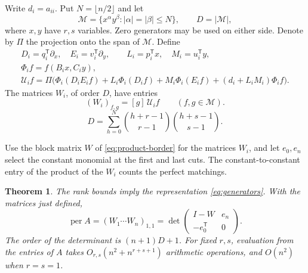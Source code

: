 \documentclass[11pt,reqno]{amsart}
\newtheorem{theorem}{Theorem}[section]
\theoremstyle{remark}
\numberwithin{equation}{section}
\newcommand{\per}{\operatorname{per}}
\begin{document}
Write \(d_i=a_{ii}\). Put \(N=\lfloor n/2\rfloor\) and let
\[
 \mathcal M=\{x^\alpha y^\beta:|\alpha|=|\beta|\leq N\},
 \qquad D=|\mathcal M|,
\]
where \(x,y\) have \(r,s\) variables. Zero generators may be used on either side. Denote by \(\Pi\) the
projection onto the span of \(\mathcal M\). Define
\[
 \begin{gathered}
 D_i=q_i^{\mathsf T}\partial_x,\quad E_i=v_i^{\mathsf T}\partial_y,
 \qquad L_i=p_i^{\mathsf T}x,\quad M_i=u_i^{\mathsf T}y,\\
 \Phi_i f=f(B_i x,C_i y),\\
 \mathcal U_i f=\Pi\big(
 \Phi_i(D_iE_i f)+L_i\Phi_i(D_i f)+M_i\Phi_i(E_i f)
                  +(d_i+L_iM_i)\Phi_i f\big).
 \end{gathered}
\]
The matrices \(W_i\), of order \(D\), have entries
\begin{equation}\label{eq:wi}
 (W_i)_{f,g}=[g]\,\mathcal U_i f\qquad(f,g\in\mathcal M).
\end{equation}
\begin{equation}\label{eq:dimension}
 D=\sum_{h=0}^N\binom{h+r-1}{r-1}\binom{h+s-1}{s-1}.
\end{equation}

Use the block matrix \(W\) of \eqref{eq:product-border} for the
matrices \(W_i\), and let \(e_0,e_n\) select the constant monomial
at the first and last cuts. The constant-to-constant entry of
the product of the \(W_i\) counts the perfect matchings.

\begin{theorem}\label{thm:path}
The rank bounds imply the representation \eqref{eq:generators}.
With the matrices just defined,
\begin{equation}\label{eq:border}
 \per A=(W_1\cdots W_n)_{1,1}
       =\det\begin{pmatrix}
                I-W & e_n\\
                -e_0^{\mathsf T}&0
             \end{pmatrix}.
\end{equation}
The order of the determinant is \((n+1)D+1\). For fixed \(r,s\),
evaluation from the entries of \(A\) takes
\(O_{r,s}(n^2+n^{r+s+1})\) arithmetic operations, and \(O(n^2)\)
when \(r=s=1\).
\end{theorem}

\subsection{}
\end{document}
